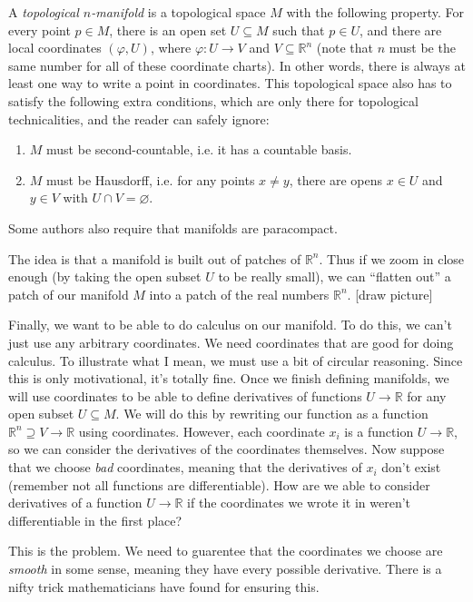 \begin{definition}\label{dfn:1-4}
	A \emph{topological $n$-manifold} is a topological space $M$ with the following property. For every point $p\in M$, there is an open set $U\subseteq M$ such that $p\in U$, and there are local coordinates $(\varphi ,U)$, where $\varphi : U \to V$ and $V\subseteq \mathbb{R} ^n$ (note that $n$ must be the same number for all of these coordinate charts). In other words, there is always at least one way to write a point in coordinates. This topological space also has to satisfy the following extra conditions, which are only there for topological technicalities, and the reader can safely ignore:
	\begin{enumerate}
		\item $M$ must be second-countable, i.e. it has a countable basis.
		\item $M$ must be Hausdorff, i.e. for any points $x\neq y$, there are opens $x\in U$ and $y\in V$ with $U \cap V = \varnothing $.
	\end{enumerate}
	Some authors also require that manifolds are paracompact.
\end{definition}

The idea is that a manifold is built out of patches of $\mathbb{R} ^n$. Thus if we zoom in close enough (by taking the open subset $U$ to be really small), we can ``flatten out'' a patch of our manifold $M$ into a patch of the real numbers $\mathbb{R} ^n$. [draw picture]

Finally, we want to be able to do calculus on our manifold. To do this, we can't just use any arbitrary coordinates. We need coordinates that are good for doing calculus. To illustrate what I mean, we must use a bit of circular reasoning. Since this is only motivational, it's totally fine. Once we finish defining manifolds, we will use coordinates to be able to define derivatives of functions $U\to \mathbb{R} $ for any open subset $U\subseteq M$. We will do this by rewriting our function as a function $\mathbb{R} ^n \supseteq V \to \mathbb{R} $ using coordinates. However, each coordinate $x_i$ is a function $U\to \mathbb{R} $, so we can consider the derivatives of the coordinates themselves. Now suppose that we choose \emph{bad} coordinates, meaning that the derivatives of $x_i$ don't exist (remember not all functions are differentiable). How are we able to consider derivatives of a function $U\to \mathbb{R} $ if the coordinates we wrote it in weren't differentiable in the first place?

This is the problem. We need to guarentee that the coordinates we choose are \emph{smooth} in some sense, meaning they have every possible derivative. There is a nifty trick mathematicians have found for ensuring this.

